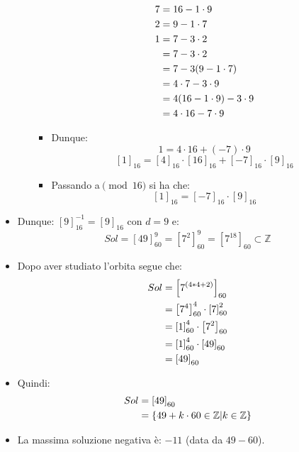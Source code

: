 \documentclass[10pt]{article}
\begin{document}
\begin{itemize}
\begin{enumerate}
\begin{itemize}
\begin{equation}
		\begin{split}
		7 &= 16 - 1 \cdot 9 \\
		2 &= 9 - 1 \cdot 7 \\
		1 &= 7 - 3 \cdot 2 \\
		&= 7 - 3 \cdot 2 \\
		&= 7 - 3(9-1 \cdot 7) \\
		&= 4 \cdot 7 - 3 \cdot 9 \\
		&= 4(16 - 1 \cdot 9) - 3 \cdot 9 \\
		&= 4 \cdot 16 - 7 \cdot 9
		\notag				
		\end{split}
		\end{equation}
		\item
		Dunque: 
		$$1 = 4 \cdot 16 + (-7) \cdot 9$$
		$$\left[1\right]_{16} = \left[4\right]_{16} \cdot \left[16\right]_{16} + \left[-7\right]_{16} \cdot \left[9\right]_{16}$$
		\item
		Passando a$\pmod{16}$ si ha che:
		$$\left[1\right]_{16} = \left[-7\right]_{16} \cdot \left[9\right]_{16}$$
		\end{itemize}
		\end{enumerate}
		\item
		Dunque: $\left[9\right]_{16}^{-1} = \left[9\right]_{16}$ con $d=9$ e: $$Sol = \left[49\right]_{60}^{9} = \left[7^2\right]_{60}^{9} = \left[7^{18}\right]_{60} \subset \mathbb{Z}$$
		\item
		Dopo aver studiato l'orbita segue che:
		\begin{equation}
		\begin{split}
		Sol &= \left[7^{(4*4+2)}\right]_{60}\\
		&= \left[7^4\right]_{60}^4 \cdot \left[7\right]_{60}^2\\
		&= \left[1\right]_{60}^4 \cdot \left[7^2\right]_{60}\\
		&= \left[1\right]_{60}^4 \cdot \left[49\right]_{60}\\
		&= \left[49\right]_{60}
		\notag
		\end{split}
		\end{equation}
		\item
		Quindi:
		\begin{equation}
		\begin{split}
		Sol &= \left[49\right]_{60}\\
		&= \{49 + k \cdot 60 \in \mathbb{Z} | k \in \mathbb{Z} \}
		\notag
		\end{split}
		\end{equation}
		\item
		La massima soluzione negativa è: $-11$ (data da $49-60$).
	\end{itemize}
	
\end{document}
